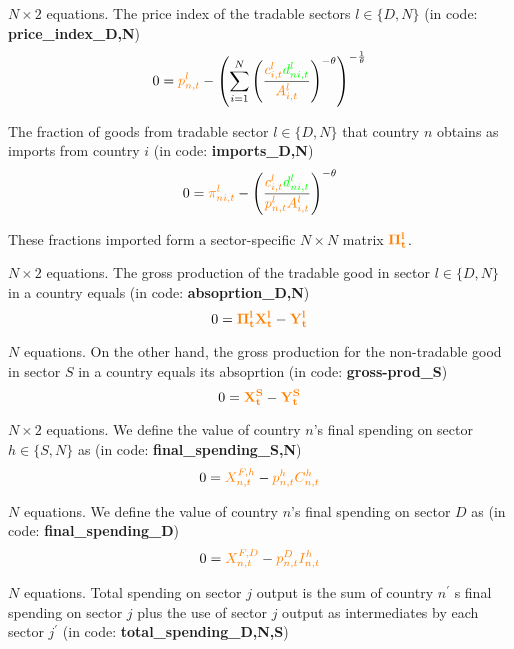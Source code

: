 \documentclass[12pt, bibtotoc, tablecaptionabove, figurecaptionabove, fleqn]{article}
\newcommand{\cl}[1]{{\color{orange}{#1}}}
\newcommand{\st}[1]{{\color{green}{#1}}}
\begin{document}
{\noindent $N \times 2$ equations. The price index of the tradable sectors $l \in \{D,N\}$ (in code: {\bf{price\_index\_D,N}})
\begin{equation}
0 = \cl{p^l_{n,t}} - \left(\sum^{N}_{i=1} \left( \frac{\cl{c^l_{i,t}} \st{d^l_{ni,t}}}{\cl{A_{i,t}^l}} \right)^{-\theta} \right)^{-\frac{1}{\theta}}
\end{equation}

The fraction of goods from tradable sector $l \in \{D,N\}$ that country $n$ obtains as imports from country $i$ (in code: {\bf{imports\_D,N}})
\begin{equation}
0 = \cl{\pi^l_{ni,t}} - \left( \frac{\cl{c^l_{i,t}} \st{d^l_{ni,t}}}{\cl{p_{n,t}^l} \cl{A_{i,t}^l}} \right)^{-\theta}
\end{equation}


These fractions imported form a sector-specific $N \times N$ matrix $\mathbf{\cl{\Pi_t^l}}$.

\noindent $N \times 2$ equations. The gross production of the tradable good in sector $l \in \{D,N\}$ in a country equals (in code: {\bf{absoprtion\_D,N}})
\begin{equation}
0 = \mathbf{\cl{\Pi^l_t}}\mathbf{\cl{X^l_t}} -  \mathbf{\cl{Y^l_t}}
\end{equation}

\noindent $N$ equations. On the other hand, the gross production for the non-tradable good in sector $S$ in a country equals its absoprtion (in code: {\bf{gross-prod\_S}})
\begin{equation}
0 = \mathbf{\cl{X^S_t}} -  \mathbf{\cl{Y^S_t}}
\end{equation}

\noindent $N \times 2$ equations. We define the value of country $n$'s final spending on sector $h \in \{S,N\}$ as (in code: {\bf{final\_spending\_S,N}}) 
\begin{equation}
0 = \cl{ X^{F,h}_{n,t}} - \cl{p^h_{n,t}} \cl{C^h_{n,t}}
\end{equation}

\noindent $N$ equations. We define the value of country $n$'s final spending on sector $D$ as  
(in code: {\bf{final\_spending\_D}}) 
\begin{equation}
0 = \cl{ X^{F,D}_{n,t}} - \cl{p^D_{n,t}} \cl{I^h_{n,t}}
\end{equation}

\noindent $N$ equations. Total spending on sector $j$ output is the sum of country $n^{\prime}$ s final spending on sector $j$
plus the use of sector $j$ output as intermediates by each sector $j^{\prime}$ (in code: {\bf{total\_spending\_D,N,S}}) 

}
\end{document}
